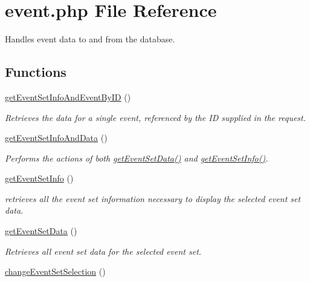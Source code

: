 \hypertarget{event_8php}{\section{event.\-php \-File \-Reference}
\label{event_8php}
}


\-Handles event data to and from the database.  


\subsection*{\-Functions}
\begin{DoxyCompactItemize}
\item 
\hyperlink{event_8php_a64e52607180419f5ac4ce6969f9a3725}{get\-Event\-Set\-Info\-And\-Event\-By\-I\-D} ()
\begin{DoxyCompactList}\small\item\em \-Retrieves the data for a single event, referenced by the \-I\-D supplied in the request. \end{DoxyCompactList}\item 
\hypertarget{event_8php_af3071b0c5bbd23339216eff1dd218349}{\hyperlink{event_8php_af3071b0c5bbd23339216eff1dd218349}{get\-Event\-Set\-Info\-And\-Data} ()}\label{event_8php_af3071b0c5bbd23339216eff1dd218349}

\begin{DoxyCompactList}\small\item\em \-Performs the actions of both \hyperlink{event_8php_a7e9028ad62a69bbcf78178653228b348}{get\-Event\-Set\-Data()} and \hyperlink{event_8php_ac111287cb3782ef6b2b3a5c5333a0164}{get\-Event\-Set\-Info()}. \end{DoxyCompactList}\item 
\hypertarget{event_8php_ac111287cb3782ef6b2b3a5c5333a0164}{\hyperlink{event_8php_ac111287cb3782ef6b2b3a5c5333a0164}{get\-Event\-Set\-Info} ()}\label{event_8php_ac111287cb3782ef6b2b3a5c5333a0164}

\begin{DoxyCompactList}\small\item\em retrieves all the event set information necessary to display the selected event set data. \end{DoxyCompactList}\item 
\hypertarget{event_8php_a7e9028ad62a69bbcf78178653228b348}{\hyperlink{event_8php_a7e9028ad62a69bbcf78178653228b348}{get\-Event\-Set\-Data} ()}\label{event_8php_a7e9028ad62a69bbcf78178653228b348}

\begin{DoxyCompactList}\small\item\em \-Retrieves all event set data for the selected event set. \end{DoxyCompactList}\item 
\hypertarget{event_8php_a13aad0d75556ac9ae9f50ee754bd36f5}{\hyperlink{event_8php_a13aad0d75556ac9ae9f50ee754bd36f5}{change\-Event\-Set\-Selection} ()}\label{event_8php_a13aad0d75556ac9ae9f50ee754bd36f5}


\end{DoxyCompactItemize}
